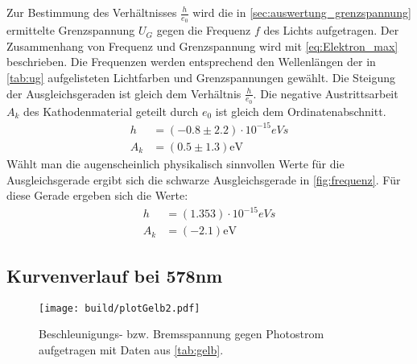 Zur Bestimmung des Verhältnisses $\frac{h}{e_0}$ wird die in \autoref{sec:auswertung_grenzspannung} ermittelte Grenzspannung $U_G$
gegen die Frequenz $f$ des Lichts aufgetragen. 
Der Zusammenhang von Frequenz und Grenzspannung wird mit \autoref{eq:Elektron_max} beschrieben.
Die Frequenzen werden entsprechend den Wellenlängen der in \autoref{tab:ug} aufgelisteten
Lichtfarben und Grenzspannungen gewählt. Die Steigung der Ausgleichsgeraden ist gleich dem Verhältnis $\frac{h}{e_0}$.
Die negative Austrittsarbeit $A_k$ des Kathodenmaterial geteilt durch $e_0$ ist gleich dem Ordinatenabschnitt.
\begin{align}
  h &= (-0.8\pm 2.2) \cdot 10^{-15} \si{eVs} \\
  A_k &= (0.5\pm 1.3) \si{\eV}
\end{align}
Wählt man die augenscheinlich physikalisch sinnvollen Werte für die Ausgleichsgerade ergibt sich die schwarze Ausgleichsgerade in \autoref{fig:frequenz}.
Für diese Gerade ergeben sich die Werte:
\begin{align}
  h &= (1.353) \cdot 10^{-15} \si{eVs} \\
  A_k &= (-2.1) \si{\eV}
\end{align}


\subsection{Kurvenverlauf bei 578nm}

\begin{figure}[H]
  \centering
  \texttt{[image: build/plotGelb2.pdf]}
  \caption{Beschleunigungs- bzw. Bremsspannung gegen Photostrom aufgetragen mit Daten aus \autoref{tab:gelb}.}
  \label{fig:gelb2}
\end{figure}

